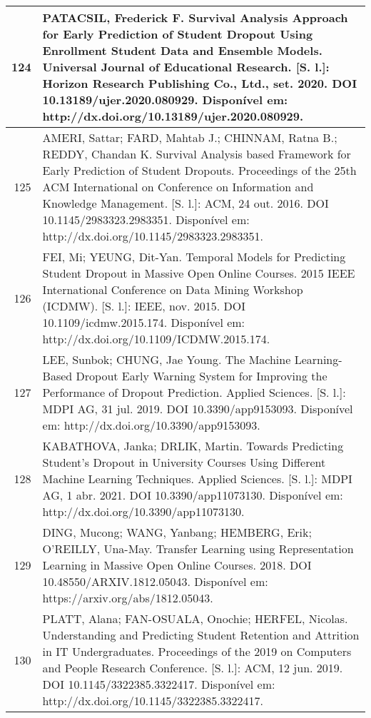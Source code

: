 \begin{apendicesenv}
\begin{longtable}[c]{|r|l|}
124 &
  \multicolumn{1}{p{14.5cm}|}{PATACSIL, Frederick F. Survival Analysis Approach for Early Prediction of Student Dropout Using Enrollment Student Data and Ensemble Models. Universal Journal of Educational Research. {[}S. l.{]}: Horizon Research Publishing Co., Ltd., set. 2020. DOI 10.13189/ujer.2020.080929. Disponível em: http://dx.doi.org/10.13189/ujer.2020.080929.} \\ \hline
125 &
  \multicolumn{1}{p{14.5cm}|}{AMERI, Sattar; FARD, Mahtab J.; CHINNAM, Ratna B.; REDDY, Chandan K. Survival Analysis based Framework for Early Prediction of Student Dropouts. Proceedings of the 25th ACM International on Conference on Information and Knowledge Management. {[}S. l.{]}: ACM, 24 out. 2016. DOI 10.1145/2983323.2983351. Disponível em: http://dx.doi.org/10.1145/2983323.2983351.} \\ \hline
126 &
  \multicolumn{1}{p{14.5cm}|}{FEI, Mi; YEUNG, Dit-Yan. Temporal Models for Predicting Student Dropout in Massive Open Online Courses. 2015 IEEE International Conference on Data Mining Workshop (ICDMW). {[}S. l.{]}: IEEE, nov. 2015. DOI 10.1109/icdmw.2015.174. Disponível em: http://dx.doi.org/10.1109/ICDMW.2015.174.} \\ \hline
127 &
  \multicolumn{1}{p{14.5cm}|}{LEE, Sunbok; CHUNG, Jae Young. The Machine Learning-Based Dropout Early Warning System for Improving the Performance of Dropout Prediction. Applied Sciences. {[}S. l.{]}: MDPI AG, 31 jul. 2019. DOI 10.3390/app9153093. Disponível em: http://dx.doi.org/10.3390/app9153093.} \\ \hline
128 &
  \multicolumn{1}{p{14.5cm}|}{KABATHOVA, Janka; DRLIK, Martin. Towards Predicting Student’s Dropout in University Courses Using Different Machine Learning Techniques. Applied Sciences. {[}S. l.{]}: MDPI AG, 1 abr. 2021. DOI 10.3390/app11073130. Disponível em: http://dx.doi.org/10.3390/app11073130.} \\ \hline
129 &
  \multicolumn{1}{p{14.5cm}|}{DING, Mucong; WANG, Yanbang; HEMBERG, Erik; O’REILLY, Una-May. Transfer Learning using Representation Learning in Massive Open Online Courses. 2018. DOI 10.48550/ARXIV.1812.05043. Disponível em: https://arxiv.org/abs/1812.05043.} \\ \hline
130 &
  \multicolumn{1}{p{14.5cm}|}{PLATT, Alana; FAN-OSUALA, Onochie; HERFEL, Nicolas. Understanding and Predicting Student Retention and Attrition in IT Undergraduates. Proceedings of the 2019 on Computers and People Research Conference. {[}S. l.{]}: ACM, 12 jun. 2019. DOI 10.1145/3322385.3322417. Disponível em: http://dx.doi.org/10.1145/3322385.3322417.} \\ \hline

\end{longtable}
\end{apendicesenv}
